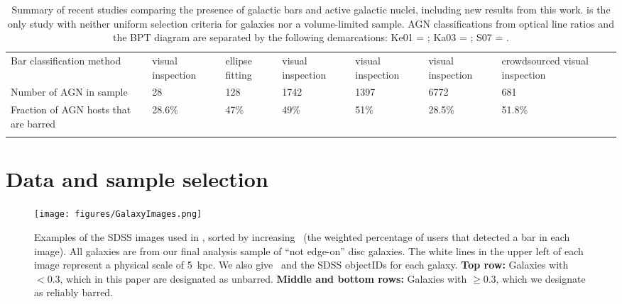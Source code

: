 \begin{table*}
\begin{tabular}{@{}p{2.5cm}p{2.6cm}p{2.2cm}p{2.2cm}p{2.5cm}p{2.5cm}p{2.5cm}@{}}
Bar classification method             & visual inspection                     & ellipse fitting                        & visual inspection     & visual inspection                & visual inspection                & crowdsourced visual inspection \\[5mm]
Number of AGN in sample               & 28                                    & 128                                    & 1742                  & 1397                             & 6772                             & 681\\[5mm]
Fraction of AGN hosts that are barred & 28.6\%                                & 47\%                                   & 49\%                  & 51\%                             & 28.5\%                           & 51.8\% \\[5mm]
\hline
\hline
\label{table}
\end{tabular}
\caption{Summary of recent studies comparing the presence of galactic bars and active galactic nuclei, including new results from this work. \citet{Martini2003} is the only study with neither uniform selection criteria for galaxies nor a volume-limited sample. AGN classifications from optical line ratios and the BPT diagram are separated by the following demarcations: Ke01 = \citet{Kewley2001}; Ka03 = \citet{Kauffmann2003a}; S07 = \citet{Schawinski2007}.}
\end{table*}
\section{Data and sample selection}
\label{sec:Sample Selection}

\begin{figure}
\centering
\texttt{[image: figures/GalaxyImages.png]}
\caption{Examples of the SDSS images used in \gztwo, sorted by increasing \pbar~(the weighted percentage of users that detected a bar in each image). All galaxies are from our final analysis sample of ``not edge-on'' disc galaxies. The white lines in the upper left of each image represent a physical scale of 5~kpc. We also give \pbar~and the SDSS objectIDs for each galaxy. \textbf{Top row:} Galaxies with \pbar$<0.3$, which in this paper are designated as unbarred. \textbf{Middle and bottom rows:} Galaxies with \pbar$\ge0.3$, which we designate as reliably barred.}
\label{gal}
\end{figure}

